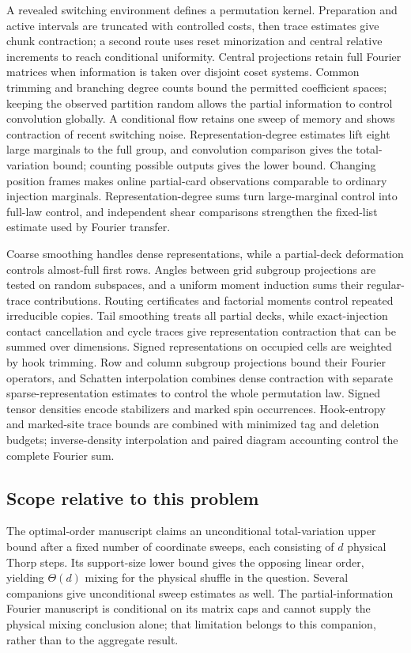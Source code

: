 \documentclass[11pt]{article}
\begin{document}
A revealed switching environment defines a permutation kernel. Preparation and active intervals are truncated with controlled costs, then trace estimates give chunk contraction; a second route uses reset minorization and central relative increments to reach conditional uniformity. Central projections retain full Fourier matrices when information is taken over disjoint coset systems. Common trimming and branching degree counts bound the permitted coefficient spaces; keeping the observed partition random allows the partial information to control convolution globally. A conditional flow retains one sweep of memory and shows contraction of recent switching noise. Representation-degree estimates lift eight large marginals to the full group, and convolution comparison gives the total-variation bound; counting possible outputs gives the lower bound. Changing position frames makes online partial-card observations comparable to ordinary injection marginals. Representation-degree sums turn large-marginal control into full-law control, and independent shear comparisons strengthen the fixed-list estimate used by Fourier transfer.

Coarse smoothing handles dense representations, while a partial-deck deformation controls almost-full first rows. Angles between grid subgroup projections are tested on random subspaces, and a uniform moment induction sums their regular-trace contributions. Routing certificates and factorial moments control repeated irreducible copies. Tail smoothing treats all partial decks, while exact-injection contact cancellation and cycle traces give representation contraction that can be summed over dimensions. Signed representations on occupied cells are weighted by hook trimming. Row and column subgroup projections bound their Fourier operators, and Schatten interpolation combines dense contraction with separate sparse-representation estimates to control the whole permutation law. Signed tensor densities encode stabilizers and marked spin occurrences. Hook-entropy and marked-site trace bounds are combined with minimized tag and deletion budgets; inverse-density interpolation and paired diagram accounting control the complete Fourier sum.

\subsection{Scope relative to this problem}
The optimal-order manuscript claims an unconditional total-variation upper bound after a fixed number of coordinate sweeps, each consisting of $d$ physical Thorp steps. Its support-size lower bound gives the opposing linear order, yielding $\Theta(d)$ mixing for the physical shuffle in the question. Several companions give unconditional sweep estimates as well. The partial-information Fourier manuscript is conditional on its matrix caps and cannot supply the physical mixing conclusion alone; that limitation belongs to this companion, rather than to the aggregate result.
\end{document}
